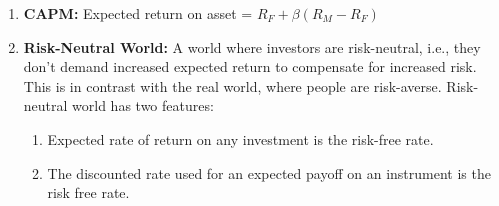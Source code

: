 \begin{enumerate}
\begin{enumerate}
        An MIT becomes a market order once the specified price has been hit.
    \end{enumerate}
    \item \textbf{CAPM:} Expected return on asset = $R_F + \beta (R_M - R_F)$
    \item \textbf{Risk-Neutral World:} A world where investors are risk-neutral, i.e., they don't demand increased expected return to compensate for increased risk. This is in contrast with the real world, where people are risk-averse.
    Risk-neutral world has two features:
    \begin{enumerate}
        \item Expected rate of return on any investment is the risk-free rate.
        \item The discounted rate used for an expected payoff on an instrument is the risk free rate.
    \end{enumerate} 
\end{enumerate}

